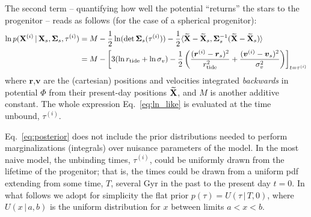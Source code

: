 \documentclass[letterpaper,12pt,preprint]{aastex}
\newcommand{\given}{\,|\,}
\newcommand{\X}{{\bf X}}
\newcommand{\bSigma}{{\bf \Sigma}}
\begin{document}
The second term -- quantifying how well the potential ``returns'' the stars to the progenitor -- reads as follows (for the case of a spherical progenitor):
\begin{align}
	\ln p(\X^{(i)} \given \X_s, \bSigma_s, \tau^{(i)}) &= M - \frac{1}{2}\ln(\det \bSigma_s(\tau^{(i)})) - \frac{1}{2}\langle \widetilde{\X}-\widetilde{\X}_s, \bSigma_s^{-1}(\widetilde{\X}-\widetilde{\X}_s) \rangle\\
	&= M - \left[3(\ln r_{\rm tide} + \ln \sigma_v) - \frac{1}{2}\left( \frac{({\boldsymbol r}^{(i)}-{\boldsymbol r}_s)^2}{r_{\rm tide}^2} + \frac{ ({\boldsymbol v}^{(i)}-{\boldsymbol v}_s)^2}{\sigma_v^2} \right)\right]_{t=\tau^{(i)}}\label{eq:ln_like}
\end{align}
where $\boldsymbol r$,$\boldsymbol v$ are the (cartesian) positions and velocities integrated \emph{backwards} in potential $\Phi$ from their present-day positions $\widetilde{\X}$, and $M$ is another additive constant. The whole expression Eq.~\ref{eq:ln_like} is evaluated at the time unbound, $\tau^{(i)}$.


Eq.~\ref{eq:posterior} does not include the prior distributions needed to perform marginalizations (integrals) over nuisance parameters of the model. In the most naive model, the unbinding times, $\tau^{(i)}$, could be uniformly drawn from the lifetime of the progenitor; that is, the times could be drawn from a uniform pdf extending from some time, $T$, several Gyr in the past to the present day $t=0$. In what follows we adopt for simplicity the flat prior $p(\tau)=U(\tau\given T, 0)$, where $U(x\given a,b)$ is the uniform distribution for $x$ between limits $a<x<b$.

\end{document}
